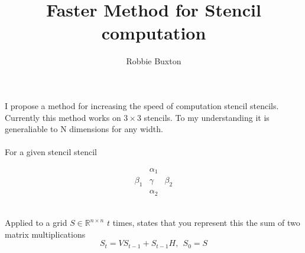 \documentclass{article}
\begin{document}
\title{Faster Method for Stencil computation}
\author{Robbie Buxton}
\maketitle
I propose a method for increasing the speed of computation stencil stencils. 
Currently this method works on $3\times 3$ stencils. To my understanding it is generaliable to N dimensions for any width. \\
\\
For a given stencil stencil
\newcommand{\stencilTop}{\alpha_{1}}
\newcommand{\stencilLeft}{\beta_{1}}
\newcommand{\stencilMiddle}{\gamma}
\newcommand{\stencilRight}{\beta_{2}}
\newcommand{\stencilBottom}{\alpha_{2}}

\[\begin{matrix} 
	& \stencilTop  & \\
	\stencilLeft  & \stencilMiddle  & \stencilRight  \\
	& \stencilBottom & 
\end{matrix}\] \\

\newcommand{\verticalBands}{V}
\newcommand{\horizontalBands}{H}
\newcommand{\sourceGrid}{S}

Applied to a grid $\sourceGrid \in \mathbb{R}^{n \times n}$ $t$ times,
\cite{10.1145/3524059.3532392} states that you represent this the sum of two matrix multiplications
\[ \sourceGrid_t = \verticalBands \sourceGrid_{t-1} + \sourceGrid_{t-1} \horizontalBands, \> \> S_0 = S\]
\end{document}
